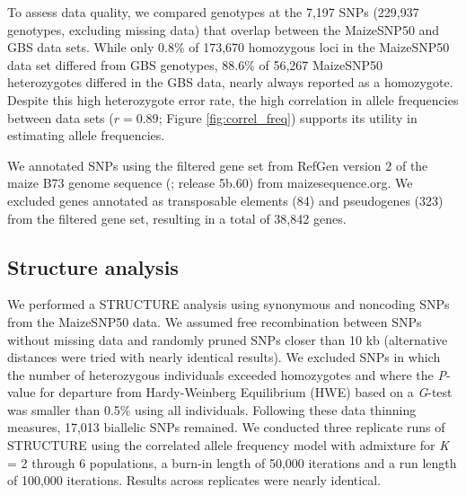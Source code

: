 To assess data quality, we compared genotypes at the 7,197 SNPs (229,937 genotypes, excluding missing data) that overlap between the MaizeSNP50 and GBS data sets. 
While only 0.8\% of 173,670 homozygous loci in the MaizeSNP50 data set differed from GBS genotypes, 88.6\% of 56,267 MaizeSNP50 heterozygotes differed in the GBS data, nearly always reported as a homozygote.
Despite this high heterozygote error rate,  the high correlation in allele frequencies between data sets ($r=0.89$; Figure \ref{fig:correl_freq}) supports its utility in estimating allele frequencies.  

We annotated SNPs using the filtered gene set from RefGen version 2 of the maize B73 genome sequence (\citealt{Schnable_2009_19965430}; release 5b.60) from maizesequence.org.  
We excluded genes annotated as transposable elements (84) and pseudogenes (323) from the filtered gene set, resulting in a total of 38,842 genes.

\subsection*{Structure analysis}
We performed a {\sf STRUCTURE} analysis \cite[]{Pritchard_2000_10835412,Falush_2003_12930761} using  synonymous and noncoding SNPs from the MaizeSNP50 data. 
We assumed free recombination between SNPs without missing data and randomly pruned SNPs closer than 10 kb (alternative distances were tried with nearly identical results). 
We excluded SNPs in which the number of heterozygous individuals exceeded homozygotes and where the \emph{P}-value for departure from Hardy-Weinberg Equilibrium (HWE) based on a \emph{G}-test was smaller than 0.5\% using all individuals. 
Following these data thinning measures, 17,013 biallelic SNPs remained. 
We conducted three replicate runs of {\sf STRUCTURE} using the correlated allele frequency model with admixture for \emph{K} = 2 through 6 populations, a burn-in length of 50,000 iterations and a run length of 100,000 iterations. 
Results across replicates were nearly identical.

